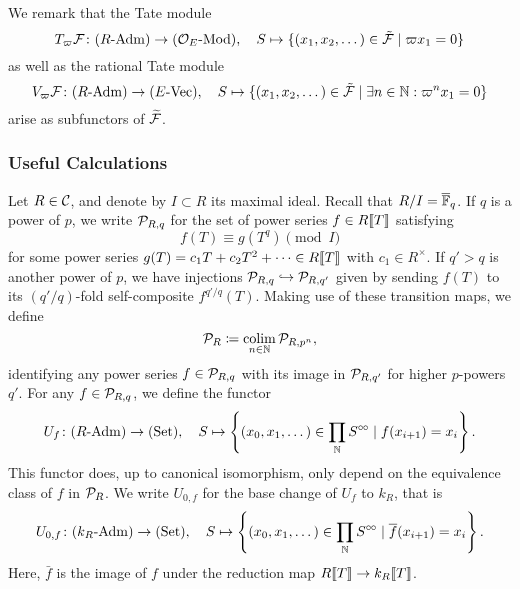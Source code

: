 \documentclass[../main.tex]{subfiles}
\begin{document}
We remark that the Tate module
\begin{equation}\label{eq:TateModuleDef}
  T_\varpi \mathcal{F} \colon {({R}\textnormal-\allowbreak\mathrm{Adm})} \to {({\mathcal{O}_E}\textnormal-\allowbreak\mathrm{Mod})}, \quad S \mapsto \{(x_1, x_2, \dots)
  \in \tilde {\mathcal{F}} \mid \varpi x_1 = 0\}
\end{equation}
as well as the rational Tate module 
\begin{equation}\label{eq:RationalTateModuleDef}
  V_\varpi \mathcal{F} \colon {({R}\textnormal-\allowbreak\mathrm{Adm})} \to {({E}\textnormal-\allowbreak\mathrm{Vec})}, \quad S \mapsto \{(x_1, x_2, \dots)
  \in \tilde {\mathcal{F}} \mid \exists n \in \mathbb{N} : \varpi^n x_1 = 0\}
\end{equation}
arise as subfunctors of $\widetilde{\mathcal{F}}$. 

\subsubsection{Useful Calculations} %
\label{ssub:Useful Calculations}
Let $R \in \mathcal{C}$, and denote by $I \subset R$ its maximal ideal. Recall that 
$R/I = {\overline {\mathbb{F}}_q}$. If $q$ is a power of $p$, we write $\mathcal{P}_{R,q}$ for the set
of power series $f \in R\llbracket T \rrbracket$ satisfying 
\begin{equation} \label{eq:condonpowerseries}
  f(T) \equiv g(T^q) \pmod I
\end{equation}
for some power series $g(T) = c_1 T + c_2 T^2 + \dots \in R\llbracket T \rrbracket$ with 
$c_1 \in R^\times$. 
If $q'>q$ is another power of $p$, we have injections $\mathcal{P}_{R,q} \hookrightarrow \mathcal{P}_{R,q'}$
given by sending $f(T)$ to its $(q'/q)$-fold self-composite $f^{q'/q}(T)$. 
Making use of these transition maps, we define
\begin{equation*}
  \mathcal{P}_R \coloneqq \operatorname*{colim}_{n \in \mathbb{N}} \mathcal{P}_{R, p^n},
\end{equation*}
identifying any power series $f \in \mathcal{P}_{R,q}$ with its image in $\mathcal{P}_{R,q'}$ for 
higher $p$-powers $q'$. 
For any $f \in \mathcal{P}_{R,q}$, we define the functor
\begin{equation*}
  U_f\colon {({R}\textnormal-\allowbreak\mathrm{Adm})} \to {(\mathrm{Set})}, \quad S \mapsto \left\{(x_0,x_1, \dots) \in \prod_{\mathbb{N}} S^{\circ \hspace{-0.5pt} \circ} 
                                          \mid f(x_{i+1}) = x_i\right\}.
\end{equation*}
This functor does, up to canonical isomorphism, only depend on the equivalence
class of $f$ in $\mathcal{P}_R$. 
We write $U_{0,f}$ for the base change of $U_f$ to $k_R$, that is
\begin{equation*}
  U_{0,f}\colon {({k_R}\textnormal-\allowbreak\mathrm{Adm})} \to {(\mathrm{Set})}, \quad S \mapsto \left\{(x_0,x_1, \dots) \in
                              \prod_{\mathbb{N}} S^{\circ \hspace{-0.5pt} \circ} \mid \overline f(x_{i+1}) = x_i\right\}.
\end{equation*}
Here, $\bar f$ is the image of $f$ under the reduction map $R\llbracket T \rrbracket \to
k_R\llbracket T \rrbracket$. 
\end{document}
